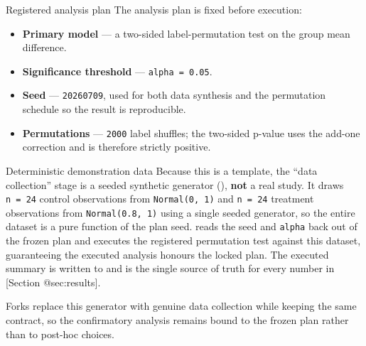 \documentclass[
  ignorenonframetext,
]{beamer}
\providecommand{\tightlist}{%
  \setlength{\itemsep}{0pt}\setlength{\parskip}{0pt}}
\begin{document}
\begin{frame}{Registered analysis plan}
\protect{}\label{registered-analysis-plan}
The analysis plan is fixed before execution:

\begin{itemize}
\tightlist
\item
  \textbf{Primary model} --- a two-sided label-permutation test on the
  group mean difference.
\item
  \textbf{Significance threshold} --- \texttt{alpha\ =\ 0.05}.
\item
  \textbf{Seed} --- \texttt{20260709}, used for both data synthesis and
  the permutation schedule so the result is reproducible.
\item
  \textbf{Permutations} --- \texttt{2000} label shuffles; the two-sided
  p-value uses the add-one correction
   and is therefore strictly
  positive.
\end{itemize}
\end{frame}

\begin{frame}{Deterministic demonstration
data}
\protect{}\label{deterministic-demonstration-data}
Because this is a template, the ``data collection'' stage is a seeded
synthetic generator (), \textbf{not} a
real study. It draws \texttt{n\ =\ 24} control observations from
\texttt{Normal(0,\ 1)} and \texttt{n\ =\ 24} treatment observations from
\texttt{Normal(0.8,\ 1)} using a single seeded generator, so the entire
dataset is a pure function of the plan seed.
 reads the seed and \texttt{alpha}
back out of the frozen plan and executes the registered permutation test
against this dataset, guaranteeing the executed analysis honours the
locked plan. The executed summary is written to
 and is the single source of
truth for every number in {[}Section @sec:results{]}.

Forks replace this generator with genuine data collection while keeping
the same  contract, so the
confirmatory analysis remains bound to the frozen plan rather than to
post-hoc choices.
\end{frame}
\end{document}
